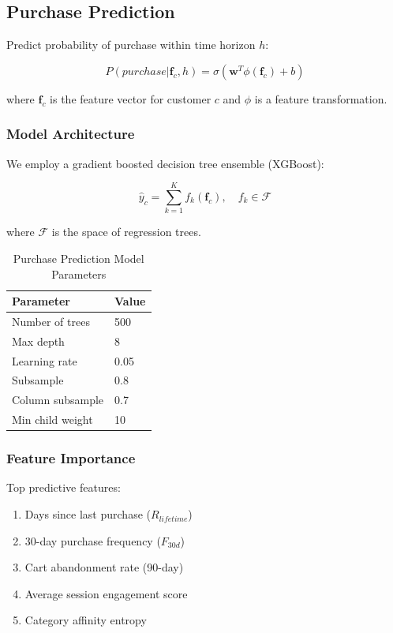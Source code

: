 \documentclass[11pt,a4paper]{article}
\begin{document}
\subsection{Purchase Prediction}

Predict probability of purchase within time horizon $h$:

\begin{equation}
P(purchase | \mathbf{f}_c, h) = \sigma(\mathbf{w}^T \phi(\mathbf{f}_c) + b)
\end{equation}

where $\mathbf{f}_c$ is the feature vector for customer $c$ and $\phi$ is a feature transformation.

\subsubsection{Model Architecture}

We employ a gradient boosted decision tree ensemble (XGBoost):

\begin{equation}
\hat{y}_c = \sum_{k=1}^{K} f_k(\mathbf{f}_c), \quad f_k \in \mathcal{F}
\end{equation}

where $\mathcal{F}$ is the space of regression trees.

\begin{table}[h]
\centering
\caption{Purchase Prediction Model Parameters}
\begin{tabular}{ll}
\toprule
\textbf{Parameter} & \textbf{Value} \\
\midrule
Number of trees & 500 \\
Max depth & 8 \\
Learning rate & 0.05 \\
Subsample & 0.8 \\
Column subsample & 0.7 \\
Min child weight & 10 \\
\bottomrule
\end{tabular}
\end{table}

\subsubsection{Feature Importance}

Top predictive features:

\begin{enumerate}
    \item Days since last purchase ($R_{lifetime}$)
    \item 30-day purchase frequency ($F_{30d}$)
    \item Cart abandonment rate (90-day)
    \item Average session engagement score
    \item Category affinity entropy
\end{enumerate}
\end{document}
